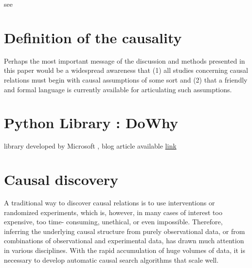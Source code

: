 \documentclass{article}
\begin{document}
see \cite{hernan2020causal}



\newpage
\section{Definition of the causality}

Perhaps the most important message of the discussion and methods presented in this paper would be a widespread awareness that (1) all studies concerning causal relations must begin with causal assumptions of some sort and (2) that a friendly and formal language is currently available for articulating such assumptions.\cite{pearl2010mathematics}

\cite{rubin2005causal}

\section{Python Library : DoWhy}
library developed by Microsoft \cite{dowhy}, blog article available \href{https://www.microsoft.com/en-us/research/blog/dowhy-a-library-for-causal-inference/}{link}


\section{Causal discovery}

A traditional way to discover causal relations is to use interventions or randomized experiments, which is, however, in many cases of interest too expensive, too time- consuming, unethical, or even impossible. Therefore, inferring the underlying causal structure from purely observational data, or from combinations of observational and experimental data, has drawn much attention in various disciplines. With the rapid accumulation of huge volumes of data, it is necessary to develop automatic causal search algorithms that scale well.\cite{10.3389/fgene.2019.00524}

\newpage
\nocite{*}    %

\end{document}
